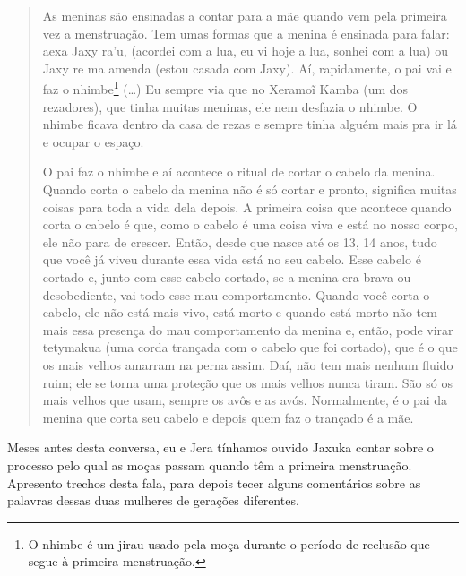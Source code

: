 \begin{quotation}
As meninas são ensinadas a contar para a mãe quando vem pela primeira
vez a menstruação. Tem umas formas que a menina é ensinada para falar:
aexa Jaxy ra’u, (acordei com a lua, eu vi hoje a lua, sonhei com a lua)
ou Jaxy re ma amenda (estou casada com Jaxy). Aí, rapidamente, o pai
vai e faz o nhimbe\footnote{O nhimbe é um jirau usado pela moça durante
o período de reclusão que segue à primeira menstruação.} (\ldots{}) Eu
sempre via que no Xeramoĩ Kamba (um dos rezadores), que tinha muitas
meninas, ele nem desfazia o nhimbe. O nhimbe ficava dentro da casa de
rezas e sempre tinha alguém mais pra ir lá e ocupar o espaço. 

O pai faz o nhimbe e aí acontece o ritual de cortar o cabelo da menina.
Quando corta o cabelo da menina não é só cortar e pronto, significa
muitas coisas para toda a vida dela depois. A primeira coisa que
acontece quando corta o cabelo é que, como o cabelo é uma coisa viva e
está no nosso corpo, ele não para de crescer. Então, desde que nasce
até os 13, 14 anos, tudo que você já viveu durante essa vida está no
seu cabelo. Esse cabelo é cortado e, junto com esse cabelo cortado, se
a menina era brava ou desobediente, vai todo esse mau comportamento.
Quando você corta o cabelo, ele não está mais vivo, está morto e quando
está morto não tem mais essa presença do mau comportamento da menina e,
então, pode virar tetymakua (uma corda trançada com o cabelo que foi
cortado), que é o que os mais velhos amarram na perna assim. Daí, não
tem mais nenhum fluido ruim; ele se torna uma proteção que os mais
velhos nunca tiram. São só os mais velhos que usam, sempre os avôs e as
avós. Normalmente, é o pai da menina que corta seu cabelo e depois quem
faz o trançado é a mãe. 

\end{quotation}
Meses antes desta conversa, eu e Jera tínhamos ouvido Jaxuka contar
sobre o processo pelo qual as moças passam quando têm a primeira
menstruação. Apresento trechos desta fala, para depois tecer alguns
comentários sobre as palavras dessas duas mulheres de gerações
diferentes. 

